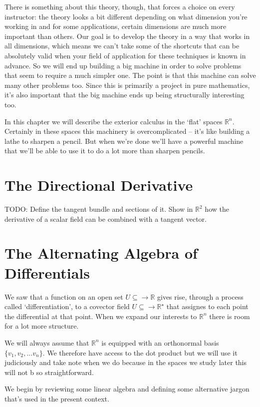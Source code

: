 \documentclass[oneside,english]{amsbook}
\numberwithin{section}{chapter}
\theoremstyle{plain}
\theoremstyle{definition}
\begin{document}
			There is something about this theory, though, that forces a choice on every instructor: the theory looks a bit different depending on what dimension you're working in and for some applications, certain dimensions are much more important than others. Our goal is to develop the theory in a way that works in all dimensions, which means we can't take some of the shortcuts that can be absolutely valid when your field of application for these techniques is known in advance. So we will end up building a big machine in order to solve problems that seem to require a much simpler one. The point is that this machine can solve many other problems too. Since this is primarily a project in pure mathematics, it's also important that the big machine ends up being structurally interesting too.
			
			In this chapter we will describe the exterior calculus in the `flat' spaces $\mathbb{R}^n$. Certainly in these spaces this machinery is overcomplicated -- it's like building a lathe to sharpen a pencil. But when we're done we'll have a powerful machine that we'll be able to use it to do a lot more than sharpen pencils.
			
		\section{The Directional Derivative}
			
			TODO: Define the tangent bundle and sections of it. Show in $\mathbb{R}^2$ how the derivative of a scalar field can be combined with a tangent vector. 
		
		\section{The Alternating Algebra of Differentials}
		
			We saw that a function on an open set $U\subseteq \to \mathbb{R}$ gives rise, through a process called `differentiation', to a covector field $U\subseteq \to \mathbb{R}^\star$ that assignes to each point the differential at that point. When we expand our interests to $\mathbb{R}^n$ there is room for a lot more structure.
			
			We will always assume that $\mathbb{R}^n$ is equipped with an orthonormal basis $\{v_1, v_2, ... v_n\}$. We therefore have access to the dot product but we will use it judiciously and take note when we do because in the spaces we study later this will not b so straightforward.
			
			We begin by reviewing some linear algebra and defining some alternative jargon that's used in the present context.
			
\end{document}
